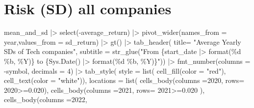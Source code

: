 \documentclass[
  12pt]{article}
\newenvironment{Shaded}{\begin{snugshade}}{\end{snugshade}}
\newcommand{\AttributeTok}[1]{\textcolor[rgb]{0.40,0.45,0.13}{#1}}
\newcommand{\DecValTok}[1]{\textcolor[rgb]{0.68,0.00,0.00}{#1}}
\newcommand{\FloatTok}[1]{\textcolor[rgb]{0.68,0.00,0.00}{#1}}
\newcommand{\FunctionTok}[1]{\textcolor[rgb]{0.28,0.35,0.67}{#1}}
\newcommand{\NormalTok}[1]{\textcolor[rgb]{0.00,0.23,0.31}{#1}}
\newcommand{\SpecialCharTok}[1]{\textcolor[rgb]{0.37,0.37,0.37}{#1}}
\newcommand{\StringTok}[1]{\textcolor[rgb]{0.13,0.47,0.30}{#1}}
\theoremstyle{definition}
\theoremstyle{remark}
\begin{document}
\begin{longtable}{lrrrrr}
\end{longtable}

\section{Risk (SD) all companies}\label{risk-sd-all-companies}

\begin{Shaded}
\begin{Highlighting}[]
\NormalTok{mean\_and\_sd }\SpecialCharTok{|\textgreater{}} 
  \FunctionTok{select}\NormalTok{(}\SpecialCharTok{{-}}\NormalTok{average\_return) }\SpecialCharTok{|\textgreater{}} 
  \FunctionTok{pivot\_wider}\NormalTok{(}\AttributeTok{names\_from =}\NormalTok{ year,}\AttributeTok{values\_from =}\NormalTok{ sd\_return) }\SpecialCharTok{|\textgreater{}} 
  \FunctionTok{gt}\NormalTok{() }\SpecialCharTok{|\textgreater{}} 
  \FunctionTok{tab\_header}\NormalTok{(}
    \AttributeTok{title=} \StringTok{"Average Yearly SDs of Tech companies"}\NormalTok{,}
    \AttributeTok{subtitle  =} \FunctionTok{str\_glue}\NormalTok{(}\StringTok{"From \{start\_date |\textgreater{} format(\textquotesingle{}\%d \%b, \%Y\textquotesingle{})\} to \{Sys.Date() |\textgreater{} format(\textquotesingle{}\%d \%b, \%Y\textquotesingle{})\}"}\NormalTok{)) }\SpecialCharTok{|\textgreater{}} 
  \FunctionTok{fmt\_number}\NormalTok{(}\AttributeTok{columns =} \SpecialCharTok{{-}}\NormalTok{symbol, }\AttributeTok{decimals  =} \DecValTok{4}\NormalTok{) }\SpecialCharTok{|\textgreater{}} 
  \FunctionTok{tab\_style}\NormalTok{(}
    \AttributeTok{style =} \FunctionTok{list}\NormalTok{(}
      \FunctionTok{cell\_fill}\NormalTok{(}\AttributeTok{color =} \StringTok{"red"}\NormalTok{), }
      \FunctionTok{cell\_text}\NormalTok{(}\AttributeTok{color =} \StringTok{"white"}\NormalTok{)), }
        \AttributeTok{locations =} \FunctionTok{list}\NormalTok{(}
      \FunctionTok{cells\_body}\NormalTok{(}\AttributeTok{columns =}\StringTok{\textasciigrave{}}\AttributeTok{2020}\StringTok{\textasciigrave{}}\NormalTok{, }
                 \AttributeTok{rows=} \StringTok{\textasciigrave{}}\AttributeTok{2020}\StringTok{\textasciigrave{}}\SpecialCharTok{\textgreater{}=}\FloatTok{0.020}\NormalTok{), }
      \FunctionTok{cells\_body}\NormalTok{(}\AttributeTok{columns =}\StringTok{\textasciigrave{}}\AttributeTok{2021}\StringTok{\textasciigrave{}}\NormalTok{, }
                 \AttributeTok{rows=} \StringTok{\textasciigrave{}}\AttributeTok{2021}\StringTok{\textasciigrave{}}\SpecialCharTok{\textgreater{}=}\FloatTok{0.020}\NormalTok{ ), }
       \FunctionTok{cells\_body}\NormalTok{(}\AttributeTok{columns =}\StringTok{\textasciigrave{}}\AttributeTok{2022}\StringTok{\textasciigrave{}}\NormalTok{, }

\end{Highlighting}
\end{Shaded}
\end{document}
